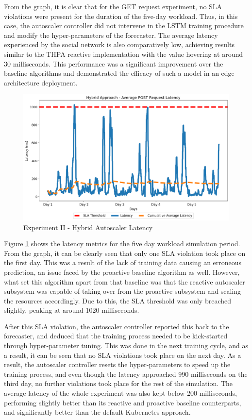 From the graph, it is clear that for the GET request experiment, no SLA violations were present for the duration of the five-day workload. Thus, in this case, the autoscaler controller did not intervene in the LSTM training procedure and modify the hyper-parameters of the forecaster. The average latency experienced by the social network is also comparatively low, achieving results similar to the THPA reactive implementation with the value hovering at around 30 milliseconds. This performance was a significant improvement over the baseline algorithms and demonstrated the efficacy of such a model in an edge architecture deployment.\par

\begin{figure}[htb]
    \centering
    \caption{Experiment II - Hybrid Autoscaler Latency}
    \label{fig:exp2-hybrid-k8s}
    \includegraphics[width=0.6\linewidth]{Figures/Compose-Post-Hybrid-Latency.png}
\end{figure}

Figure \ref{fig:exp2-hybrid-k8s} shows the latency metrics for the five day workload simulation period. From the graph, it can be clearly seen that only one SLA violation took place on the first day. This was a result of the lack of training data causing an erroneous prediction, an issue faced by the proactive baseline algorithm as well. However, what set this algorithm apart from that baseline was that the reactive autoscaler subsystem was capable of taking over from the proactive subsystem and scaling the resources accordingly. Due to this, the SLA threshold was only breached slightly, peaking at around 1020 milliseconds.\par
After this SLA violation, the autoscaler controller reported this back to the forecaster, and deduced that the training process needed to be kick-started through hyper-parameter tuning. This was done in the next training cycle, and as a result, it can be seen that no SLA violations took place on the next day. As a result, the autoscaler controller resets the hyper-parameters to speed up the training process, and even though the latency approached 990 milliseconds on the third day, no further violations took place for the rest of the simulation. The average latency of the whole experiment was also kept below 200 milliseconds, performing slightly better than its reactive and proactive baseline counterparts, and significantly better than the default Kubernetes approach.\par

